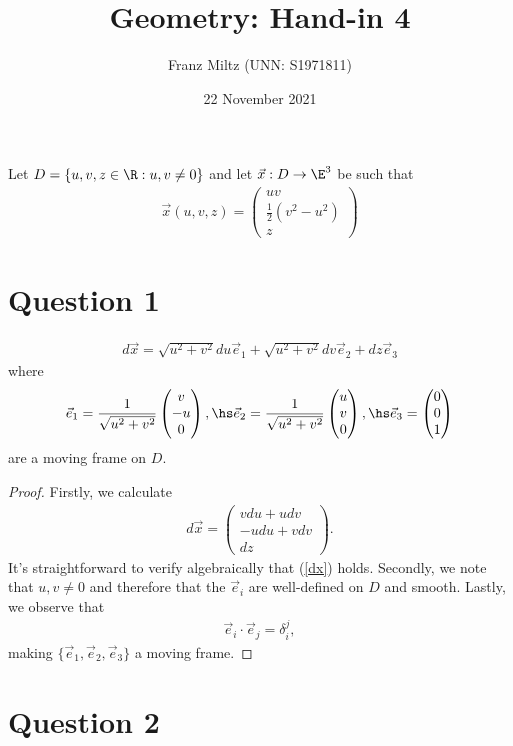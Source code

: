 \documentclass{article}
\begin{document}
\title{Geometry: Hand-in 4}
\author{Franz Miltz (UNN: S1971811)}
\date{22 November 2021}
\maketitle
\noindent Let $D=\{u,v,z\in\R : u,v\not=0\}$ and let $\vec x:D\to\E^3$ be such that 
\begin{align*}
   \vec x(u,v,z) = \begin{pmatrix}
      uv \\ \frac{1}{2}(v^2 - u^2) \\ z
   \end{pmatrix}
\end{align*}

\section*{Question 1}

\begin{claim*}
   \begin{align}
      \label{dx}
      d\vec x = \sqrt{u^2 + v^2}du\vec e_1
      + \sqrt{u^2 + v^2}dv \vec e_2
      + dz\vec e_3
   \end{align}
   where
   \begin{align*}
      \vec e_1 = \frac{1}{\sqrt{u^2 + v^2}}\begin{pmatrix}
         v \\ -u \\ 0
      \end{pmatrix} , \hs
      \vec e_2 = \frac{1}{\sqrt{u^2 + v^2}}\begin{pmatrix}
         u \\ v \\ 0
      \end{pmatrix}, \hs 
      \vec e_3 = \begin{pmatrix}
         0 \\ 0 \\ 1
      \end{pmatrix}
   \end{align*}
   are a moving frame on $D$.
\end{claim*}
\begin{proof}
   Firstly, we calculate 
   \begin{align*}
      d\vec x = \begin{pmatrix}
         v du + u dv \\
         -u du + v dv \\
         dz
      \end{pmatrix}.
   \end{align*} 
   It's straightforward to verify algebraically that (\ref{dx}) holds. Secondly,
   we note that $u,v\not=0$ and therefore that the $\vec e_i$ are well-defined on $D$
   and smooth. Lastly, we observe that 
   \begin{align}
      \vec e_i \cdot \vec e_j = \delta_i^j,
   \end{align}
   making $\{\vec e_1, \vec e_2, \vec e_3\}$ a moving frame.
\end{proof}

\section*{Question 2}
\end{document}
